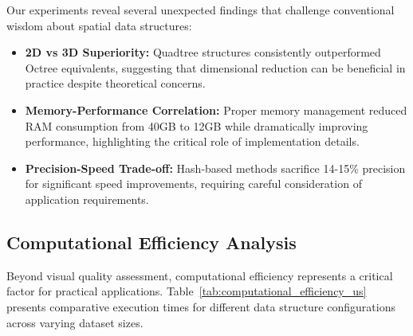 \documentclass{sbc2023}
\begin{document}
Our experiments reveal several unexpected findings that challenge conventional wisdom about spatial data structures:

\begin{itemize}
    \item \textbf{2D vs 3D Superiority:} Quadtree structures consistently outperformed Octree equivalents, suggesting that dimensional reduction can be beneficial in practice despite theoretical concerns.
    \item \textbf{Memory-Performance Correlation:} Proper memory management reduced RAM consumption from 40GB to 12GB while dramatically improving performance, highlighting the critical role of implementation details.
    \item \textbf{Precision-Speed Trade-off:} Hash-based methods sacrifice 14-15\% precision for significant speed improvements, requiring careful consideration of application requirements.
\end{itemize}

\subsection{Computational Efficiency Analysis}

Beyond visual quality assessment, computational efficiency represents a critical factor for practical applications. Table~\ref{tab:computational_efficiency_us} presents comparative execution times for different data structure configurations across varying dataset sizes.
\end{document}

